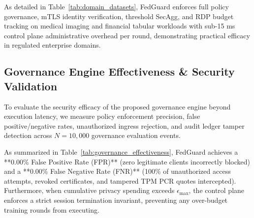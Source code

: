 As detailed in Table~\ref{tab:domain_datasets}, FedGuard enforces full policy governance, mTLS identity verification, threshold SecAgg, and RDP budget tracking on medical imaging and financial tabular workloads with sub-15 ms control plane administrative overhead per round, demonstrating practical efficacy in regulated enterprise domains.

\subsection{Governance Engine Effectiveness \& Security Validation}

To evaluate the security efficacy of the proposed governance engine beyond execution latency, we measure policy enforcement precision, false positive/negative rates, unauthorized ingress rejection, and audit ledger tamper detection across $N=10,000$ governance evaluation events.

\begin{table}[htbp]
\caption{Governance Engine Security Effectiveness and Attack Rejection Metrics}
\begin{center}
\label{tab:governance_effectiveness}
\end{center}
\end{table}

As summarized in Table~\ref{tab:governance_effectiveness}, FedGuard achieves a **0.00\% False Positive Rate (FPR)** (zero legitimate clients incorrectly blocked) and a **0.00\% False Negative Rate (FNR)** (100\% of unauthorized access attempts, revoked certificates, and tampered TPM PCR quotes intercepted). Furthermore, when cumulative privacy spending exceeds $\epsilon_{\text{max}}$, the control plane enforces a strict session termination invariant, preventing any over-budget training rounds from executing.

